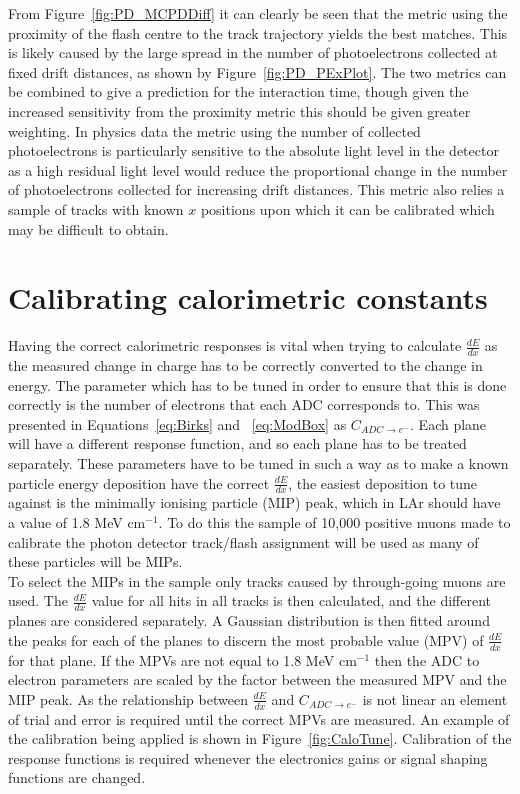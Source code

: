 From Figure~\ref{fig:PD_MCPDDiff} it can clearly be seen that the metric using the proximity of the flash centre to the track trajectory yields the best matches. This is likely caused by the large spread in the number of photoelectrons collected at fixed drift distances, as shown by Figure~\ref{fig:PD_PExPlot}. The two metrics can be combined to give a prediction for the interaction time, though given the increased sensitivity from the proximity metric this should be given greater weighting. In physics data the metric using the number of collected photoelectrons is particularly sensitive to the absolute light level in the detector as a high residual light level would reduce the proportional change in the number of photoelectrons collected for increasing drift distances. This metric also relies a sample of tracks with known $x$ positions upon which it can be calibrated which may be difficult to obtain. \\

\section{Calibrating calorimetric constants} \label{sec:MCCalib} %
Having the correct calorimetric responses is vital when trying to calculate $\frac{dE}{dx}$ as the measured change in charge has to be correctly converted to the change in energy. The parameter which has to be tuned in order to ensure that this is done correctly is the number of electrons that each ADC corresponds to. This was presented in Equations~\ref{eq:Birks} and ~\ref{eq:ModBox} as $C_{ADC \rightarrow e^{-}}$. Each plane will have a different response function, and so each plane has to be treated separately. These parameters have to be tuned in such a way as to make a known particle energy deposition have the correct $\frac{dE}{dx}$, the easiest deposition to tune against is the minimally ionising particle (MIP) peak, which in LAr should have a value of 1.8 MeV cm$^{-1}$. To do this the sample of 10,000 positive muons made to calibrate the photon detector track/flash assignment will be used as many of these particles will be MIPs. \\

To select the MIPs in the sample only tracks caused by through-going muons are used. The $\frac{dE}{dx}$ value for all hits in all tracks is then calculated, and the different planes are considered separately. A Gaussian distribution is then fitted around the peaks for each of the planes to discern the most probable value (MPV) of $\frac{dE}{dx}$ for that plane. If the MPVs are not equal to 1.8 MeV cm$^{-1}$ then the ADC to electron parameters are scaled by the factor between the measured MPV and the MIP peak. As the relationship between $\frac{dE}{dx}$ and $C_{ADC \rightarrow e^{-}}$ is not linear an element of trial and error is required until the correct MPVs are measured. An example of the calibration being applied is shown in Figure~\ref{fig:CaloTune}. Calibration of the response functions is required whenever the electronics gains or signal shaping functions are changed.

